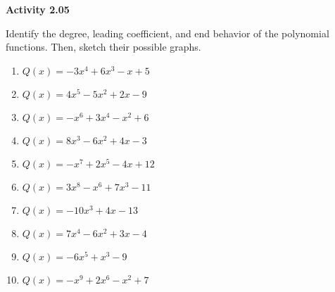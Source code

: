 \vspace{0.3ex}
\noindent\textbf{Activity 2.05}

\vspace{0.2ex}

Identify the degree, leading coefficient, and end behavior of the polynomial functions. Then, sketch their possible graphs.
\begin{multicols}{2}
\begin{enumerate}
    \item \( Q(x) = -3x^4 + 6x^3 - x + 5 \)
    \item \( Q(x) = 4x^5 - 5x^2 + 2x - 9 \)
    \item \( Q(x) = -x^6 + 3x^4 - x^2 + 6 \)
    \item \( Q(x) = 8x^3 - 6x^2 + 4x - 3 \)
    \item \( Q(x) = -x^7 + 2x^5 - 4x + 12 \)
    \item \( Q(x) = 3x^8 - x^6 + 7x^3 - 11 \)
    \item \( Q(x) = -10x^3 + 4x - 13 \)
    \item \( Q(x) = 7x^4 - 6x^2 + 3x - 4 \)
    \item \( Q(x) = -6x^5 + x^3 - 9 \)
    \item \( Q(x) = -x^9 + 2x^6 - x^2 + 7 \)
\end{enumerate}
\end{multicols}
